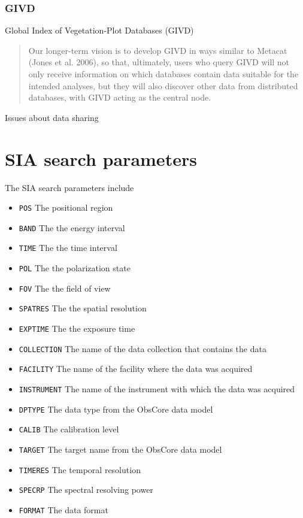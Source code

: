 \documentclass{article}
\begin{document}
 

\subsubsection{GIVD}
Global Index of Vegetation-Plot Databases (GIVD)

\begin{quote}
Our longer-term vision is to develop GIVD in ways similar to Metacat (Jones et
al. 2006), so that, ultimately, users who query GIVD will not only receive
information on which databases contain data suitable for the intended analyses,
but they will also discover other data from distributed databases, with GIVD
acting as the central node.
\end{quote}








Issues about data sharing










\appendix
\section{SIA search parameters}
\noindent
The SIA search parameters include
\begin{itemize}
  \item \texttt{POS}  The positional region
  \item \texttt{BAND} The the energy interval
  \item \texttt{TIME} The the time interval
  \item \texttt{POL}  The the polarization state
  \item \texttt{FOV}  The the field of view
  \item \texttt{SPATRES} The the spatial resolution
  \item \texttt{EXPTIME} The the exposure time
  \item \texttt{COLLECTION} The name of the data collection that contains the data
  \item \texttt{FACILITY} The name of the facility where the data was acquired
  \item \texttt{INSTRUMENT} The name of the instrument with which the data was acquired
  \item \texttt{DPTYPE} The data type from the ObsCore
   data model
  \item \texttt{CALIB} The calibration level
  \item \texttt{TARGET} The target name from the ObsCore
   data model
  \item \texttt{TIMERES} The temporal resolution
  \item \texttt{SPECRP} The spectral resolving power
  \item \texttt{FORMAT} The data format
\end{itemize}



\theendnotes
\end{document}
